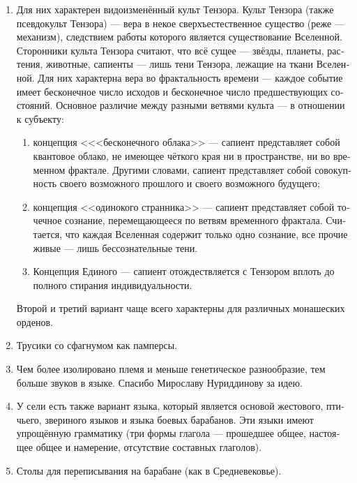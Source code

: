 \documentclass[a4paper,12pt,fleqn]{book}\usepackage{polyglossia}\setdefaultlanguage[babelshorthands=true]{russian}\setotherlanguage{english}\defaultfontfeatures{Ligatures=TeX,Mapping=tex-text}\usepackage{xcolor}\newcommand{\ml}[3]{#2}
\begin{document}
{\begin{enumerate}
\item Для них характерен видоизменённый культ Тензора.
Культ Тензора (также псевдокульт Тензора) --- вера в некое сверхъестественное существо (реже --- механизм), следствием работы которого является существование Вселенной.
Сторонники культа Тензора считают, что всё сущее --- звёзды, планеты, растения, животные, сапиенты --- лишь тени Тензора, лежащие на ткани Вселенной.
Для них характерна вера во фрактальность времени --- каждое событие имеет бесконечное число исходов и бесконечное число предшествующих состояний.
Основное различие между разными ветвями культа --- в отношении к субъекту:

\begin{enumerate}
\item концепция <<<бесконечного облака>> --- сапиент представляет собой квантовое облако, не имеющее чёткого края ни в пространстве, ни во временном фрактале.
Другими словами, сапиент представляет собой совокупность своего возможного прошлого и своего возможного будущего;
\item концепция <<одинокого странника>> --- сапиент представляет собой точечное сознание, перемещающееся по ветвям временного фрактала.
Считается, что каждая Вселенная содержит только одно сознание, все прочие живые --- лишь бессознательные тени.
\item Концепция Единого --- сапиент отождествляется с Тензором вплоть до полного стирания индивидуальности.                                                                                                            \end{enumerate}

Второй и третий вариант чаще всего характерны для различных монашеских орденов.

\item Трусики со сфагнумом как памперсы.

\item Чем более изолировано племя и меньше генетическое разнообразие, тем больше звуков в языке.
Спасибо Мирославу Нуриддинову за идею.

\item У сели есть также вариант языка, который является основой жестового, птичьего, звериного языков и языка боевых барабанов.
Эти языки имеют упрощённую грамматику (три формы глагола --- прошедшее общее, настоящее общее и намерение, отсутствие составных глаголов).

\item Столы для переписывания на барабане (как в Средневековье).


\end{enumerate}}
\end{document}
